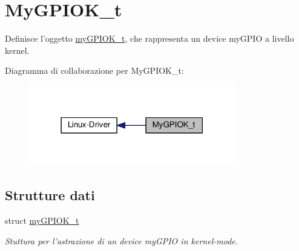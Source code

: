 \hypertarget{group__my_g_p_i_o_k__t}{\section{My\+G\+P\+I\+O\+K\+\_\+t}
\label{group__my_g_p_i_o_k__t}
}


Definisce l'oggetto \hyperlink{structmy_g_p_i_o_k__t}{my\+G\+P\+I\+O\+K\+\_\+t}, che rappresenta un device my\+G\+P\+I\+O a livello kernel.  


Diagramma di collaborazione per My\+G\+P\+I\+O\+K\+\_\+t\+:\nopagebreak
\begin{figure}[H]
\begin{center}
\leavevmode
\includegraphics[width=255pt]{group__my_g_p_i_o_k__t}
\end{center}
\end{figure}
\subsection*{Strutture dati}
\begin{DoxyCompactItemize}
\item 
struct \hyperlink{structmy_g_p_i_o_k__t}{my\+G\+P\+I\+O\+K\+\_\+t}
\begin{DoxyCompactList}\small\item\em Stuttura per l'astrazione di un device my\+G\+P\+I\+O in kernel-\/mode. \end{DoxyCompactList}\end{DoxyCompactItemize}
